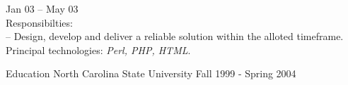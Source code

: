 \documentclass[letterpaper, 11pt]{article}
\begin{document}
\begin{resume}
\begin{block}
\begin{subcategory}{Jan 03 -- May 03}
                \\[1ex]
                Responsibilties: \\
                -- Design, develop and deliver a reliable solution within the alloted timeframe.
                \\[1ex]
                Principal technologies: \emph{Perl, PHP, HTML}.
                \bigskip
                \bigskip
            \end{subcategory}
        \end{block}
        \begin{block}
            \begin{category}{Education}
                 {North Carolina State University}
                        { }                        {Fall 1999 - Spring 2004}
            \end{category}
        \end{block}
    \end{resume}
\end{document}
